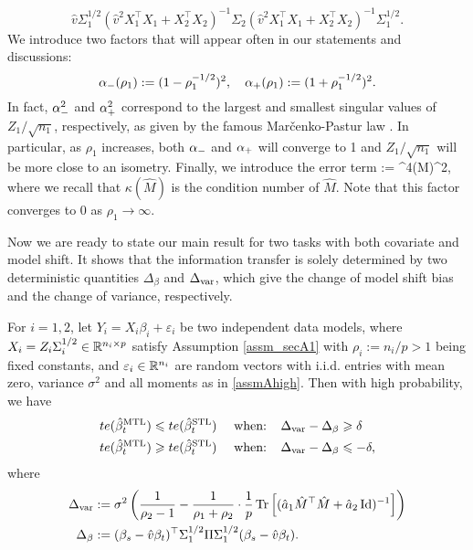 $$\hat v\Sigma_1^{1/2} (\hat{v}^2 X_1^{\top}X_1 + X_2^{\top}X_2)^{-1} \Sigma_2 (\hat{v}^2 X_1^{\top}X_1 + X_2^{\top}X_2)^{-1}\Sigma_1^{1/2}.$$ 
We introduce two factors that will appear often in our statements and discussions:
$$\alpha_-(\rho_1):=(1- \rho_1^{-1/2})^2,\quad \alpha_+(\rho_1):=(1 + \rho_1^{-1/2})^2.$$ 
In fact, $\alpha_-^2$ and $\alpha_+^2$ correspond to the largest and smallest singular values of $Z_1/\sqrt{n_1}$, respectively, as given by the famous Mar{\v c}enko-Pastur law \cite{MP}. In particular, as $\rho_1$ increases, both $\alpha_-$ and $\alpha_+$ will converge to 1 and $Z_1/\sqrt{n_1}$ will be more close to an isometry. Finally, we introduce the error term  
\be\label{eq_deltaextra}\delta:= \cdot \kappa^4(\hat M)\cdot {}^2,\ee
where we recall that $\kappa(\hat M)$ is the condition number of $\hat M$. Note that this factor converges to 0 as $\rho_1\to \infty$.


Now we are ready to state our main result for two tasks with both covariate and model shift. It shows that the information transfer is solely determined by two deterministic quantities $\Delta_{\beta}$ and $\Delta_{\text{var}}$, which give the change of model shift bias and the change of variance, respectively.



\begin{theorem}\label{thm_model_shift}
For $i=1,2$, let $Y_i = X_i\beta_i + \varepsilon_i$ be two independent data models, where $X_i=Z_i\Sigma_i^{1/2}\in \mathbb{R}^{n_i\times p}$ satisfy Assumption \ref{assm_secA1} with $\rho_i:=n_i/p>1$ being fixed constants, and ${\varepsilon}_i\in \mathbb{R}^{n_i}$ are  random vectors with i.i.d. entries with mean zero, variance $\sigma^2$ and all moments as in \eqref{assmAhigh}.  
	Then with high probability, we have
	\begin{align}
	 	te(\hat{\beta}_{t}^{\text{MTL}}) \leqslant te(\hat{\beta}_t^{\text{STL}}) \quad \text{ when: } \ \ &\Delta_{\text{var}} - \Delta_{\beta} \geqslant  \delta \label{upper}\\
		te(\hat{\beta}_t^{\text{MTL}}) \geqslant te(\hat{\beta}_t^{\text{STL}}) \quad \text{ when: } \ \ &\Delta_{\text{var}} - \Delta_{\beta} \leqslant -\delta, \label{lower}
	\end{align}
	where
	\begin{align} %
		\Delta_{\vari} &\define {\sigma^2}\bigbrace{\frac{1}{\rho_2 - 1} -  \frac{1}{\rho_1 + \rho_2}\cdot \frac1p \bigtr{(\hat a_1 \hat M^{\top}\hat M + \hat a_2\id)^{-1}} }  \\
		\Delta_{\beta} &\define (\beta_s - \hat{v}\beta_t)^{\top} \Sigma_1^{1/2} \Pi \Sigma_1^{1/2} (\beta_s - \hat{v}\beta_t). 
	\end{align}
\end{theorem}

